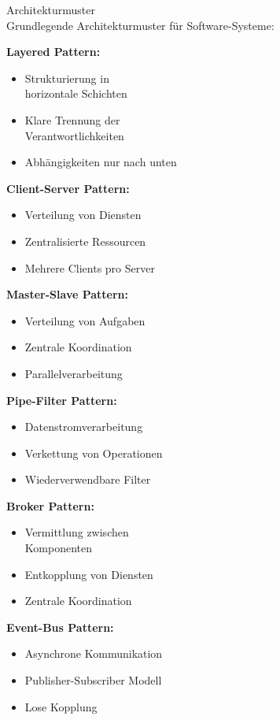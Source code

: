 \begin{concept}{Architekturmuster}\\
Grundlegende Architekturmuster für Software-Systeme:

\begin{minipage}[t]{0.52\textwidth}
\textbf{Layered Pattern:} 
    \begin{itemize}
        \item Strukturierung in\\ horizontale Schichten
        \item Klare Trennung der\\ Verantwortlichkeiten
        \item Abhängigkeiten nur nach unten
    \end{itemize}
    
\textbf{Client-Server Pattern:}
    \begin{itemize}
        \item Verteilung von Diensten
        \item Zentralisierte Ressourcen
        \item Mehrere Clients pro Server
    \end{itemize}
    
\textbf{Master-Slave Pattern:}
    \begin{itemize}
        \item Verteilung von Aufgaben
        \item Zentrale Koordination
        \item Parallelverarbeitung
    \end{itemize}
\end{minipage}
\begin{minipage}[t]{0.48\textwidth}
\textbf{Pipe-Filter Pattern:}
    \begin{itemize}
        \item Datenstromverarbeitung
        \item Verkettung von Operationen
        \item Wiederverwendbare Filter
    \end{itemize}
    
\textbf{Broker Pattern:}
    \begin{itemize}
        \item Vermittlung zwischen \\Komponenten
        \item Entkopplung von Diensten
        \item Zentrale Koordination
    \end{itemize}
    
 \textbf{Event-Bus Pattern:}
    \begin{itemize}
        \item Asynchrone Kommunikation
        \item Publisher-Subscriber Modell
        \item Lose Kopplung
    \end{itemize}
\end{minipage}
\end{concept}

